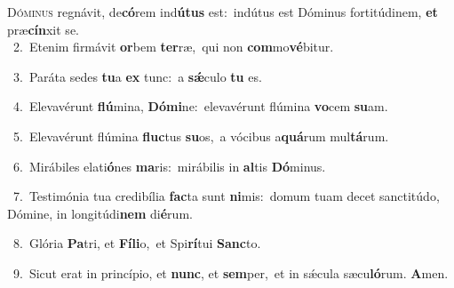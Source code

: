 \lettrine{\initial\textcolor{\initialcolor}{D}}{óminus} regnávit, de\-\textbf{có}\-rem ind\-\textbf{ú}\-\textbf{tus} est:~\star indútus est Dóminus fortitúdinem, \textbf{et} præ\-\textbf{cín}\-xit se.\\
{\numbfont\textcolor{\numbcolor}{~2.}}~Etenim firmávit \textbf{or}\-bem \textbf{ter}\-ræ,~\star qui non \textbf{com}\-mo\-\textbf{vé}\-bitur.\par
{\numbfont\textcolor{\numbcolor}{~3.}}~Paráta sedes \textbf{tu}\-a \textbf{ex} tunc:~\star a \textbf{sǽ}\-culo \textbf{tu} es.\par
{\numbfont\textcolor{\numbcolor}{~4.}}~Elevavérunt \textbf{flú}\-mina, \textbf{Dó}\-\textbf{mi}ne:~\star elevavérunt flúmina \textbf{vo}\-cem \textbf{su}\-am.\par
{\numbfont\textcolor{\numbcolor}{~5.}}~Elevavérunt flúmina \textbf{fluc}\-tus \textbf{su}\-os,~\star a vócibus a\-\textbf{quá}\-rum mul\-\textbf{tá}\-rum.\par
{\numbfont\textcolor{\numbcolor}{~6.}}~Mirábiles elati\-\textbf{ó}\-nes \textbf{ma}\-ris:~\star mirábilis in \textbf{al}\-tis \textbf{Dó}\-minus.\par
{\numbfont\textcolor{\numbcolor}{~7.}}~Testimónia tua credibília \textbf{fac}\-ta sunt \textbf{ni}\-mis:~\star domum tuam decet sanctitúdo, Dómine, in longitúdi\textbf{nem} di\-\textbf{é}\-rum.\par
{\numbfont\textcolor{\numbcolor}{~8.}}~Glória \textbf{Pa}\-tri, et \textbf{Fí}\-\textbf{li}o,~\star et Spi\-\textbf{rí}\-tui \textbf{Sanc}\-to.\par
{\numbfont\textcolor{\numbcolor}{~9.}}~Sicut erat in princípio, et \textbf{nunc}\-, et \textbf{sem}\-per,~\star et in sǽcula sæcu\-\textbf{ló}\-rum. \textbf{A}\-men.\par
